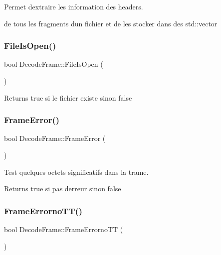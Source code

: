 Permet d\textquotesingle{}extraire les information des headers. 

de tous les fragments d\textquotesingle{}un fichier et de les stocker dans des std\+::vector \mbox{\label{classDecodeFrame_a5d8e060fc486a29d456973255c88e876}} 
\subsubsection{\texorpdfstring{File\+Is\+Open()}{FileIsOpen()}}
{\footnotesize\ttfamily bool Decode\+Frame\+::\+File\+Is\+Open (\begin{DoxyParamCaption}{ }\end{DoxyParamCaption})\hspace{0.3cm}{\ttfamily [inline]}}

\begin{DoxyReturn}{Returns}
true si le fichier existe sinon false 
\end{DoxyReturn}
\mbox{\label{classDecodeFrame_a177c97af4a097447759fdbd28ef8d18a}} 
\subsubsection{\texorpdfstring{Frame\+Error()}{FrameError()}}
{\footnotesize\ttfamily bool Decode\+Frame\+::\+Frame\+Error (\begin{DoxyParamCaption}{ }\end{DoxyParamCaption})}



Test quelques octets significatifs dans la trame. 

\begin{DoxyReturn}{Returns}
true si pas d\textquotesingle{}erreur sinon false 
\end{DoxyReturn}
\mbox{\label{classDecodeFrame_a4c5721b8abf506ea36ceba56d07d930b}} 
\subsubsection{\texorpdfstring{Frame\+Errorno\+T\+T()}{FrameErrornoTT()}}
{\footnotesize\ttfamily bool Decode\+Frame\+::\+Frame\+Errorno\+TT (\begin{DoxyParamCaption}{ }\end{DoxyParamCaption})}



